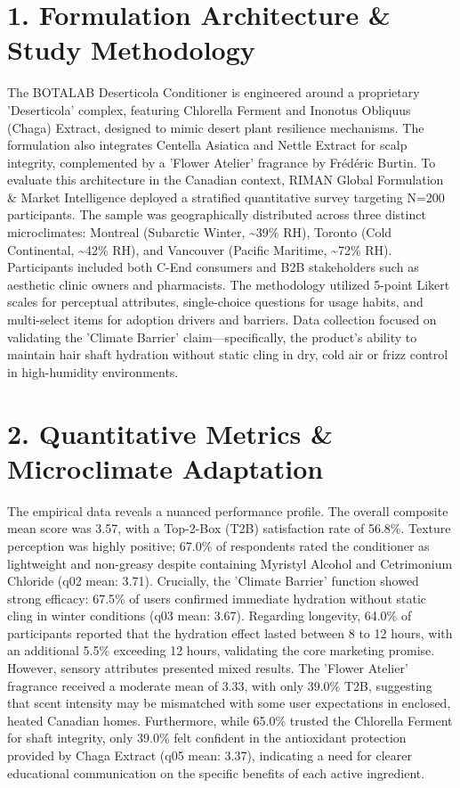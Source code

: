 \documentclass[10pt,twocolumn,a4paper]{article}
\begin{document}
\section{1. Formulation Architecture \& Study Methodology}
The BOTALAB Deserticola Conditioner is engineered around a proprietary 'Deserticola' complex, featuring Chlorella Ferment and Inonotus Obliquus (Chaga) Extract, designed to mimic desert plant resilience mechanisms. The formulation also integrates Centella Asiatica and Nettle Extract for scalp integrity, complemented by a 'Flower Atelier' fragrance by Frédéric Burtin. To evaluate this architecture in the Canadian context, RIMAN Global Formulation \& Market Intelligence deployed a stratified quantitative survey targeting N=200 participants. The sample was geographically distributed across three distinct microclimates: Montreal (Subarctic Winter, \textasciitilde{}39\% RH), Toronto (Cold Continental, \textasciitilde{}42\% RH), and Vancouver (Pacific Maritime, \textasciitilde{}72\% RH). Participants included both C-End consumers and B2B stakeholders such as aesthetic clinic owners and pharmacists. The methodology utilized 5-point Likert scales for perceptual attributes, single-choice questions for usage habits, and multi-select items for adoption drivers and barriers. Data collection focused on validating the 'Climate Barrier' claim—specifically, the product's ability to maintain hair shaft hydration without static cling in dry, cold air or frizz control in high-humidity environments.
\section{2. Quantitative Metrics \& Microclimate Adaptation}
The empirical data reveals a nuanced performance profile. The overall composite mean score was 3.57, with a Top-2-Box (T2B) satisfaction rate of 56.8\%. Texture perception was highly positive; 67.0\% of respondents rated the conditioner as lightweight and non-greasy despite containing Myristyl Alcohol and Cetrimonium Chloride (q02 mean: 3.71). Crucially, the 'Climate Barrier' function showed strong efficacy: 67.5\% of users confirmed immediate hydration without static cling in winter conditions (q03 mean: 3.67). Regarding longevity, 64.0\% of participants reported that the hydration effect lasted between 8 to 12 hours, with an additional 5.5\% exceeding 12 hours, validating the core marketing promise. However, sensory attributes presented mixed results. The 'Flower Atelier' fragrance received a moderate mean of 3.33, with only 39.0\% T2B, suggesting that scent intensity may be mismatched with some user expectations in enclosed, heated Canadian homes. Furthermore, while 65.0\% trusted the Chlorella Ferment for shaft integrity, only 39.0\% felt confident in the antioxidant protection provided by Chaga Extract (q05 mean: 3.37), indicating a need for clearer educational communication on the specific benefits of each active ingredient.
\end{document}
